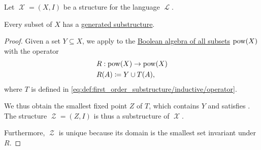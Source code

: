 \begin{proposition}\label{thm:first_order_generated_substructures_exist}
  Let \( \mscrX = (X, I) \) be a structure for the language \( \mscrL \).

  Every subset of \( X \) has a \hyperref[def:first_order_generated_substructure]{generated substructure}.
\end{proposition}
\begin{proof}
  Given a set \( Y \subseteq X \), we apply  to the \hyperref[thm:boolean_algebra_of_subsets]{Boolean algebra of all subsets} \( \operatorname{pow}(X) \) with the operator
  \begin{equation*}
    \begin{aligned}
      &R: \operatorname{pow}(X) \to \operatorname{pow}(X) \\
      &R(A) \coloneqq Y \cup T(A),
    \end{aligned}
  \end{equation*}
  where \( T \) is defined in \eqref{eq:def:first_order_substructure/inductive/operator}.

  We thus obtain the smallest fixed point \( Z \) of \( T \), which contains \( Y \) and satisfies . The structure \( \mscrZ = (Z, I) \) is thus a substructure of \( \mscrX \).

  Furthermore, \( \mscrZ \) is unique because its domain is the smallest set invariant under \( R \).
\end{proof}

